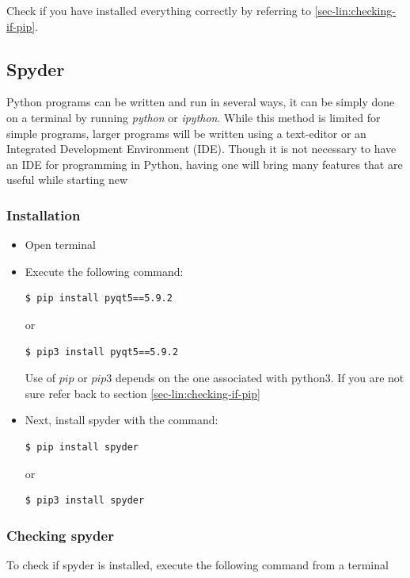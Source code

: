 \documentclass{cmc}
\begin{document}
Check if you have installed everything correctly by referring to
\ref{sec-lin:checking-if-pip}.

\subsection{Spyder}
\label{sec-mac:spyder}

Python programs can be written and run in several ways, it can be
simply done on a terminal by running \textit{python} or
\textit{ipython}. While this method is limited for simple programs,
larger programs will be written using a text-editor or an Integrated
Development Environment (IDE). Though it is not necessary to have an
IDE for programming in Python, having one will bring many features
that are useful while starting new

\subsubsection{Installation}
\label{sec-lin:installation-spyder}

\begin{itemize}
\item Open terminal
\item Execute the following command:
\begin{lstlisting}[language=bash]
$ pip install pyqt5==5.9.2
\end{lstlisting}
  or
\begin{lstlisting}[language=bash]
$ pip3 install pyqt5==5.9.2
\end{lstlisting}
  Use of $pip$ or $pip3$ depends on the one associated with python3.
  If you are not sure refer back to section
  \ref{sec-lin:checking-if-pip}
\item Next, install spyder with the command:
\begin{lstlisting}[language=bash]
$ pip install spyder
\end{lstlisting}
  or
\begin{lstlisting}[language=bash]
$ pip3 install spyder
\end{lstlisting}
\end{itemize}

\subsubsection{Checking spyder}
\label{seclin:checking-if-spyder}

To check if spyder is installed, execute the following command from a
terminal
\end{document}
